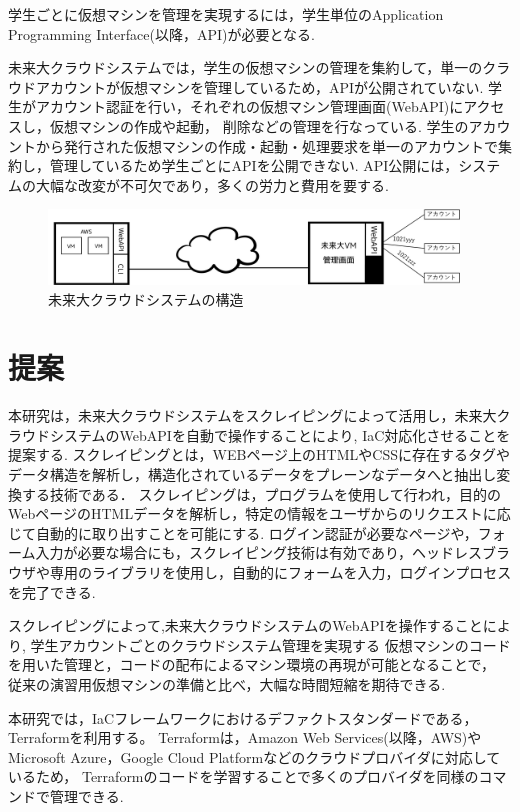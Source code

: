 \documentclass[11pt]{ujarticle}\sloppy
\begin{document}
学生ごとに仮想マシンを管理を実現するには，学生単位のApplication Programming Interface(以降，API)が必要となる.

未来大クラウドシステムでは，学生の仮想マシンの管理を集約して，単一のクラウドアカウントが仮想マシンを管理しているため，APIが公開されていない.
学生がアカウント認証を行い，それぞれの仮想マシン管理画面(WebAPI)にアクセスし，仮想マシンの作成や起動， 削除などの管理を行なっている.
学生のアカウントから発行された仮想マシンの作成・起動・処理要求を単一のアカウントで集約し，管理しているため学生ごとにAPIを公開できない.
API公開には，システムの大幅な改変が不可欠であり，多くの労力と費用を要する.



\begin{figure}[h]
	\includegraphics[width=1\linewidth,height=2cm]{./images/cloud.png}
	\caption{未来大クラウドシステムの構造}
	\label{fig:cloud}
\end{figure}



\section{提案}


本研究は，未来大クラウドシステムをスクレイピングによって活用し，未来大クラウドシステムのWebAPIを自動で操作することにより,
IaC対応化させることを提案する.
スクレイピングとは，WEBページ上のHTMLやCSSに存在するタグやデータ構造を解析し，構造化されているデータをプレーンなデータへと抽出し変換する技術である．
スクレイピングは，プログラムを使用して行われ，目的のWebページのHTMLデータを解析し，特定の情報をユーザからのリクエストに応じて自動的に取り出すことを可能にする.
ログイン認証が必要なページや，フォーム入力が必要な場合にも，スクレイピング技術は有効であり，ヘッドレスブラウザや専用のライブラリを使用し，自動的にフォームを入力，ログインプロセスを完了できる.

スクレイピングによって,未来大クラウドシステムのWebAPIを操作することにより,
学生アカウントごとのクラウドシステム管理を実現する
仮想マシンのコードを用いた管理と，コードの配布によるマシン環境の再現が可能となることで，
従来の演習用仮想マシンの準備と比べ，大幅な時間短縮を期待できる.


本研究では，IaCフレームワークにおけるデファクトスタンダードである，Terraformを利用する。
Terraformは，Amazon Web Services(以降，AWS)や
Microsoft Azure，Google Cloud Platformなどのクラウドプロバイダに対応しているため，
Terraformのコードを学習することで多くのプロバイダを同様のコマンドで管理できる.
\end{document}
